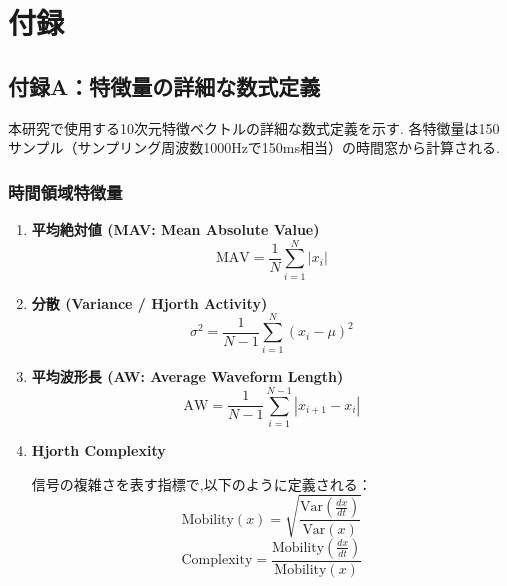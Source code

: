 \chapter*{付録}
\setcounter{page}{1}

\section*{付録A：特徴量の詳細な数式定義}

本研究で使用する10次元特徴ベクトルの詳細な数式定義を示す.
各特徴量は150サンプル（サンプリング周波数1000Hzで150ms相当）の時間窓から計算される.

\subsection*{時間領域特徴量}

\begin{enumerate}
    \item \textbf{平均絶対値 (MAV: Mean Absolute Value)}
    \begin{equation}
        \text{MAV} = \frac{1}{N} \sum_{i=1}^{N} |x_i|
    \end{equation}
    
    \item \textbf{分散 (Variance / Hjorth Activity)}
    \begin{equation}
        \sigma^2 = \frac{1}{N-1} \sum_{i=1}^{N} (x_i - \mu)^2
    \end{equation}
    
    \item \textbf{平均波形長 (AW: Average Waveform Length)}
    \begin{equation}
        \text{AW} = \frac{1}{N-1} \sum_{i=1}^{N-1} |x_{i+1} - x_i|
    \end{equation}
    
    \item \textbf{Hjorth Complexity}
    
    信号の複雑さを表す指標で,以下のように定義される：
    \begin{equation}
        \text{Mobility}(x) = \sqrt{\frac{\text{Var}(\frac{dx}{dt})}{\text{Var}(x)}}
    \end{equation}
    \begin{equation}
        \text{Complexity} = \frac{\text{Mobility}(\frac{dx}{dt})}{\text{Mobility}(x)}
    \end{equation}
\end{enumerate}

